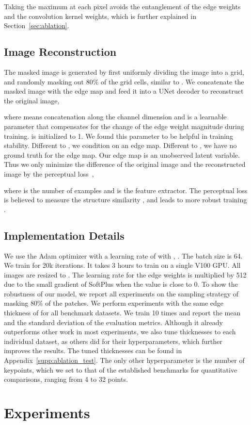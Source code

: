 \documentclass{article}
\begin{document}
Taking the maximum at each pixel avoids the entanglement of the edge weights and the convolution kernel weights, which is further explained in Section~\ref{sec:ablation}.

\subsection{Image Reconstruction}
The masked image  is generated by first uniformly dividing the image  into a  grid, and randomly masking out 80\% of the grid cells, similar to \cite{he2021masked}. 
We concatenate the masked image with the edge map and feed it into a UNet decoder \cite{ronneberger2015u} to reconstruct the original image,

where  means concatenation along the channel dimension and  is a learnable parameter that compensates for the change of the edge weight magnitude during training.  is initialized to 1. We found this parameter to be helpful in training stability.
Different to \cite{he2021masked}, we condition on an edge map.
Different to \cite{jakab2020self}, we have no ground truth for the edge map. Our edge map is an unobserved latent variable. Thus we only minimize the difference of the original image and the reconstructed image by the perceptual loss~\cite{johnson2016perceptual},

where  is the number of examples and  is the feature extractor.
The perceptual loss is believed to measure the structure similarity \cite{johnson2016perceptual, gatys2016image, dosovitskiy2016generating}, and leads to more robust training \cite{jakab2018unsupervised, jakab2020self}.

\subsection{Implementation Details} \label{sec:implementation_details}
We use the Adam optimizer \cite{KingmaB14} with a learning rate of  with , . The batch size is 64. We train for 20k iterations. It takes 3 hours to train on a single V100 GPU. All images are resized to . The learning rate for the edge weights is multiplied by 512 due to the small gradient of SoftPlus \cite{dugas2000incorporating} when the value is close to 0.
To show the robustness of our model, we report all experiments on the sampling strategy of masking 80\% of the  patches. 
We perform experiments with the same edge thickness of  for all benchmark datasets. 
We train 10 times and report the mean and the standard deviation of the evaluation metrics. 
Although it already outperforms other work in most experiments, we also tune thicknesses to each individual dataset, as others did for their hyperparameters, which further improves the results. The tuned thicknesses can be found in Appendix~\ref{supp:ablation_test}.
The only other hyperparameter is the number of keypoints, which we set to that of the established benchmarks for quantitative comparisons, ranging from 4 to 32 points. \section{Experiments} \label{experiment}
\end{document}

